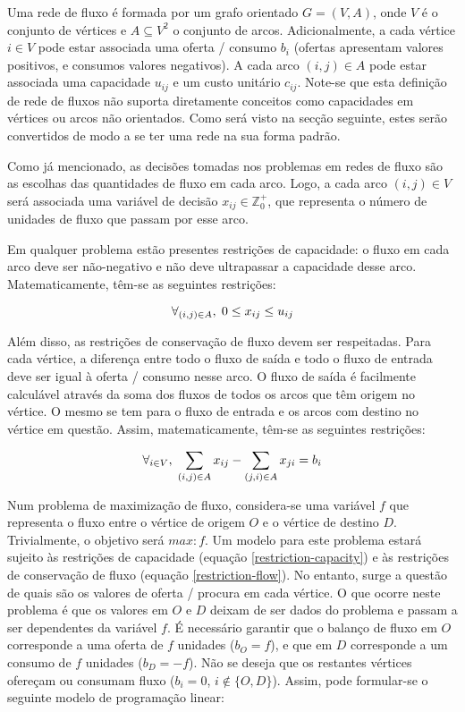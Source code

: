 \documentclass[12pt, a4paper, titlepage]{article}
\begin{document}
Uma rede de fluxo é formada por um grafo orientado $G = (V, A)$, onde $V$ é o conjunto de vértices e
$A \subseteq V^2$ o conjunto de arcos. Adicionalmente, a cada vértice $i \in V$ pode estar associada
uma oferta / consumo $b_i$ (ofertas apresentam valores positivos, e consumos valores negativos). A
cada arco $(i, j) \in A$ pode estar associada uma capacidade $u_{i j}$ e um custo unitário
$c_{i j}$. Note-se que esta definição de rede de fluxos não suporta diretamente conceitos como
capacidades em vértices ou arcos não orientados. Como será visto na secção seguinte, estes serão
convertidos de modo a se ter uma rede na sua forma padrão.

Como já mencionado, as decisões tomadas nos problemas em redes de fluxo são as escolhas das
quantidades de fluxo em cada arco. Logo, a cada arco $(i, j) \in V$ será associada uma variável de
decisão $x_{i j} \in \mathbb{Z}_0^+$, que representa o número de unidades de fluxo que passam por
esse arco.

Em qualquer problema estão presentes restrições de capacidade: o fluxo em cada arco deve ser
não-negativo e não deve ultrapassar a capacidade desse arco. Matematicamente, têm-se as seguintes
restrições:

\begin{equation}
    \label{restriction-capacity}
    \forall_{(i, j) \in A}, \hspace{1mm} 0 \le x_{i j} \le u_{i j}
\end{equation}

Além disso, as restrições de conservação de fluxo devem ser respeitadas. Para cada vértice, a
diferença entre todo o fluxo de saída e todo o fluxo de entrada deve ser igual à oferta / consumo
nesse arco. O fluxo de saída é facilmente calculável através da soma dos fluxos de todos os arcos
que têm origem no vértice. O mesmo se tem para o fluxo de entrada e os arcos com destino no
vértice em questão. Assim, matematicamente, têm-se as seguintes restrições:

\begin{equation}
    \label{restriction-flow}
    \forall_{i \in V}, \hspace{1mm} \sum_{(i, j) \in A} x_{i j} - \sum_{(j, i) \in A} x_{j i} = b_i
\end{equation}

Num problema de maximização de fluxo, considera-se uma variável $f$ que representa o fluxo entre
o vértice de origem $O$ e o vértice de destino $D$. Trivialmente, o objetivo será $max: f$. Um
modelo para este problema estará sujeito às restrições de capacidade (equação
\ref{restriction-capacity}) e às restrições de conservação de fluxo (equação
\ref{restriction-flow}). No entanto, surge a questão de quais são os valores de oferta / procura em
cada vértice. O que ocorre neste problema é que os valores em $O$ e $D$ deixam de ser dados do
problema e passam a ser dependentes da variável $f$. É necessário garantir que o balanço de fluxo em
$O$ corresponde a uma oferta de $f$ unidades ($b_O = f$), e que em $D$ corresponde a um consumo de
$f$ unidades ($b_D = -f$). Não se deseja que os restantes vértices ofereçam ou consumam fluxo
($b_i = 0$, $i \not \in \{O, D\}$). Assim, pode formular-se o seguinte modelo de programação linear:
\end{document}
